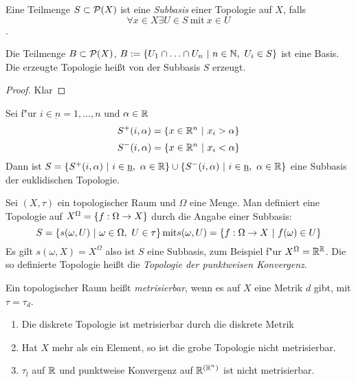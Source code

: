 \documentclass{skript}
\begin{document}
\begin{dfn}
    Eine Teilmenge $S\subset \mathcal{P}(X)$ ist eine \emph{Subbasis} einer
    Topologie auf $X$, falls \[ \forall x\in X \exists U\in S \ \mathrm{mit}\
    x\in U \].
    \begin{stz}
        Die Teilmenge $B \subset \mathcal{P}(X)$, $B := \mdef[U_1 \cap \ldots
        \cap U_n]{n\in \N,\ U_i \in S}$ ist eine Basis. Die erzeugte Topologie
        hei\ss{}t von der Subbasis $S$ erzeugt.
        \begin{proof}
            Klar
        \end{proof}
    \end{stz}
    \begin{bsp}
        Sei f"ur $i\in \underbar{n} = {1, \ldots, n}$ und $\alpha\in\mathbb{R}$
        \[S^+(i, \alpha)=\mdef[x\in\R^n]{x_i>\alpha}\]
        \[S^-(i, \alpha)=\mdef[x\in\R^n]{x_i<\alpha}\]
        Dann ist $S=\mdef[S^+(i,\alpha)]{i\in\underbar n,\ \alpha\in\R}
        \cup \mdef[S^-(i,\alpha)]{i\in\underbar n,\ \alpha\in\R}$
        eine Subbasis der euklidischen Topologie.
    \end{bsp}
    \begin{bsp}
        Sei $(X,\tau)$ ein topologischer Raum und $\Omega$ eine Menge. Man
        definiert eine Topologie auf $X^\Omega = \mdef{f:\Omega\to X}$ durch die
        Angabe einer Subbasis:
        \[S=\mdef[s(\omega, U)]{\omega\in\Omega,\ U\in\tau} \mathrm{ mit }
        s(\omega, U)=\mdef[f:\Omega\to X]{f(\omega)\in U}\]
        Es gilt $s(\omega, X)=X^\Omega$ also ist $S$ eine Subbasis, zum Beispiel
        f"ur $X^\Omega = \mathbb{R}^{\mathbb{R}}$. Die so definierte Topologie hei\ss{}t die
        \emph{Topologie der punktweisen Konvergenz}.
    \end{bsp}
\end{dfn}

\begin{dfn}
    Ein topologischer Raum hei\ss{}t \emph{metrisierbar}, wenn es auf $X$ eine
    Metrik $d$ gibt, mit $\tau=\tau_d$.
    \begin{bsp}
        \begin{enumerate}
            \item Die diskrete Topologie ist metrisierbar durch die diskrete Metrik
            \item Hat $X$ mehr als ein Element, so ist die grobe Topologie nicht
                metrisierbar.
            \item $\tau_l$ auf $\mathbb{R}$ und punktweise Konvergenz auf $\mathbb{R}^{(\mathbb{R}^n)}$ ist
                nicht metrisierbar.
        \end{enumerate}
    \end{bsp}
\end{dfn}
\end{document}

